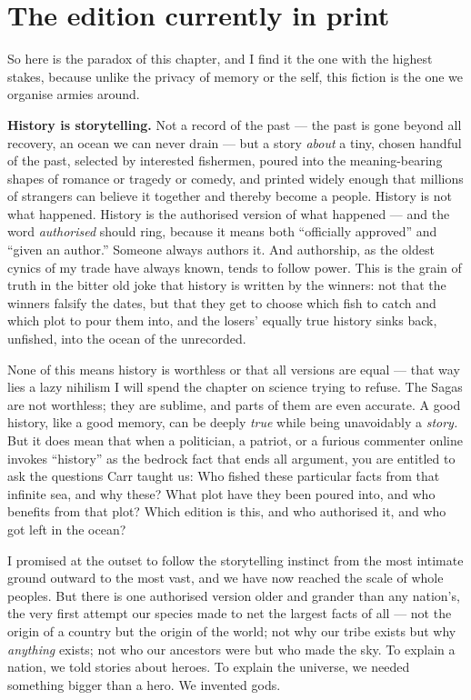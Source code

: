 \section*{The edition currently in print}

So here is the paradox of this chapter, and I find it the one with the highest stakes, because unlike the privacy of memory or the self, this fiction is the one we organise armies around.

\textbf{History is storytelling.} Not a record of the past — the past is gone beyond all recovery, an ocean we can never drain — but a story \emph{about} a tiny, chosen handful of the past, selected by interested fishermen, poured into the meaning-bearing shapes of romance or tragedy or comedy, and printed widely enough that millions of strangers can believe it together and thereby become a people. History is not what happened. History is the authorised version of what happened — and the word \emph{authorised} should ring, because it means both ``officially approved'' and ``given an author.'' Someone always authors it. And authorship, as the oldest cynics of my trade have always known, tends to follow power. This is the grain of truth in the bitter old joke that history is written by the winners: not that the winners falsify the dates, but that they get to choose which fish to catch and which plot to pour them into, and the losers' equally true history sinks back, unfished, into the ocean of the unrecorded.

None of this means history is worthless or that all versions are equal — that way lies a lazy nihilism I will spend the chapter on science trying to refuse. The Sagas are not worthless; they are sublime, and parts of them are even accurate. A good history, like a good memory, can be deeply \emph{true} while being unavoidably a \emph{story.} But it does mean that when a politician, a patriot, or a furious commenter online invokes ``history'' as the bedrock fact that ends all argument, you are entitled to ask the questions Carr taught us: Who fished these particular facts from that infinite sea, and why these? What plot have they been poured into, and who benefits from that plot? Which edition is this, and who authorised it, and who got left in the ocean?

I promised at the outset to follow the storytelling instinct from the most intimate ground outward to the most vast, and we have now reached the scale of whole peoples. But there is one authorised version older and grander than any nation's, the very first attempt our species made to net the largest facts of all — not the origin of a country but the origin of the world; not why our tribe exists but why \emph{anything} exists; not who our ancestors were but who made the sky. To explain a nation, we told stories about heroes. To explain the universe, we needed something bigger than a hero. We invented gods.

